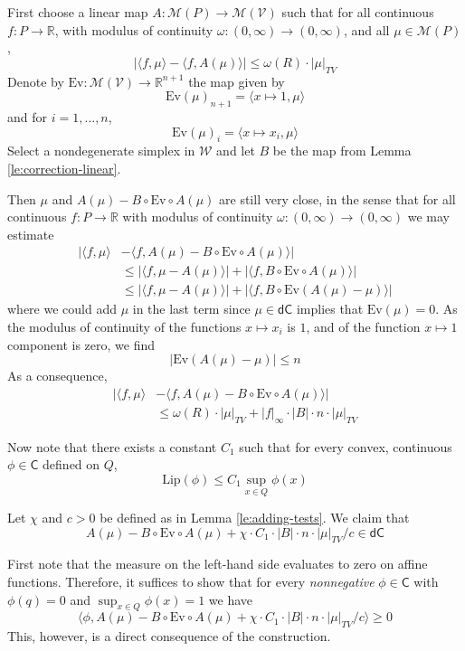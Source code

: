 \documentclass[12pt]{amsart}
\begin{document}
\begin{Proof}
First choose a linear map $A: \mathcal{M}(P) \to \mathcal{M}(\mathcal{V})$ such that for all continuous $f:P \to \mathbb{R}$, with modulus of continuity $\omega:(0,\infty) \to (0,\infty)$, and all $\mu \in \mathcal{M}(P)$,
\[
|\langle f, \mu \rangle - \langle f, A(\mu) \rangle | \leq  \omega(R) \cdot |\mu|_{TV}
\]	
Denote by $\mathrm{Ev}: \mathcal{M}(\mathcal{V}) \to \mathbb{R}^{n+1}$ the map given by 
\[
\mathrm{Ev}(\mu)_{n+1} = \langle x \mapsto 1, \mu \rangle
\]
and for $i = 1, \dots, n$,
\[
\mathrm{Ev}(\mu)_i = \langle x \mapsto x_i , \mu \rangle
\]
Select a nondegenerate simplex in $\mathcal{W}$ and let $B$ be the map from Lemma \ref{le:correction-linear}.

Then $\mu$ and $A(\mu) - B \circ \mathrm{Ev} \circ A(\mu)$ are still very close, in the sense that for all continuous $f:P \to \mathbb{R}$ with modulus of continuity $\omega:(0,\infty) \to (0,\infty)$ we may estimate
\[
\begin{split}
|\langle f, \mu \rangle & - \langle f, A(\mu) - B \circ \mathrm{Ev} \circ A(\mu) \rangle |\\
&\leq |\langle f, \mu - A(\mu)\rangle| 
+ |\langle f, B \circ \mathrm{Ev} \circ A(\mu) \rangle| \\
& \leq |\langle f, \mu - A(\mu)\rangle| 
+ |\langle f, B \circ \mathrm{Ev} (A(\mu) - \mu) \rangle|
\end{split}
\]
where we could add $\mu$ in the last term since $\mu \in \mathsf{dC}$ implies that $\mathrm{Ev}(\mu) = 0$. As the modulus of continuity of the functions $x \mapsto x_i$ is $1$, and of the function $x \mapsto 1$ component is zero, we find
\[
| \mathrm{Ev}(A(\mu) - \mu) | \leq n
\]
As a consequence,
\[
\begin{split}
|\langle f, \mu \rangle & - \langle f, A(\mu) - B \circ \mathrm{Ev} \circ A(\mu) \rangle |\\
&\leq \omega(R) \cdot |\mu|_{TV} + |f|_\infty \cdot |B| \cdot n \cdot |\mu|_{TV}
\end{split}
\]

Now note that there exists a constant $C_1$ such that for every convex, continuous $\phi \in \mathsf{C}$ defined on $Q$,
\[
\mathrm{Lip}(\phi ) \leq C_1 \sup_{x \in Q} \phi(x)
\]

Let $\chi$ and $c>0$ be defined as in Lemma \ref{le:adding-tests}. 
We claim that
\[
A(\mu) - B \circ \mathrm{Ev} \circ A(\mu) + \chi \cdot C_1 \cdot |B| \cdot n \cdot |\mu|_{TV} / c \in \mathsf{dC}
\]

First note that the measure on the left-hand side evaluates to zero on affine functions. 
Therefore, it suffices to show that for every \emph{nonnegative} $\phi \in \mathsf{C}$ with $\phi(q) = 0$ and $\sup_{x \in Q} \phi(x) = 1$ we have
\[
\langle \phi, A(\mu) - B \circ \mathrm{Ev} \circ A(\mu) + \chi \cdot C_1 \cdot |B| \cdot n \cdot |\mu|_{TV} / c \rangle \geq 0
\]
This, however, is a direct consequence of the construction.
\end{Proof}
\end{document}
